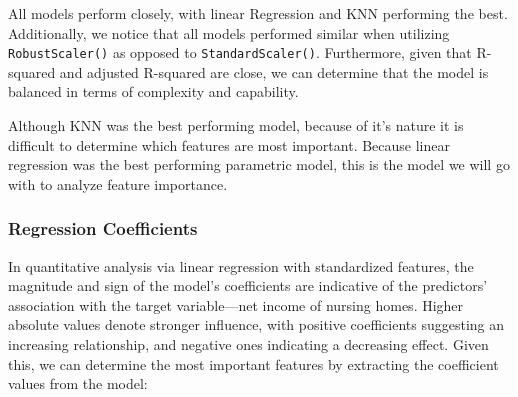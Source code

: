 \documentclass{article}
\theoremstyle{mytheoremstyle}
\theoremstyle{mytheoremstyle}
\theoremstyle{myproblemstyle}
\begin{document}
\FloatBarrier %

All models perform closely, with linear Regression and KNN performing the best. Additionally, we notice that all models performed similar when utilizing \texttt{RobustScaler()} as opposed to \texttt{StandardScaler()}. Furthermore, given that R-squared and adjusted R-squared are close, we can determine that the model is balanced in terms of complexity and capability. 

Although KNN was the best performing model, because of it's nature it is difficult to determine which features are most important. Because linear regression was the best performing parametric model, this is the model we will go with to analyze feature importance. 
\pagebreak

\subsubsection{Regression Coefficients}

In quantitative analysis via linear regression with standardized features, the magnitude and sign of the model's coefficients are indicative of the predictors' association with the target variable—net income of nursing homes. Higher absolute values denote stronger influence, with positive coefficients suggesting an increasing relationship, and negative ones indicating a decreasing effect. Given this, we can determine the most important features by extracting the coefficient values from the model:
\end{document}
